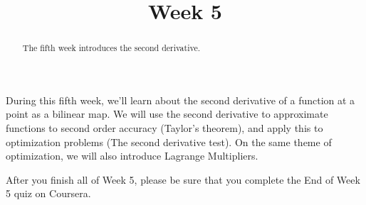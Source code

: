 \documentclass{ximera}
\title{Week 5}
\begin{document}
\begin{abstract}
  The fifth week introduces the second derivative.
\end{abstract}

During this fifth week, we'll learn about the second derivative of a
function at a point as a bilinear map.  We will use the second
derivative to approximate functions to second order accuracy (Taylor's
theorem), and apply this to optimization problems (The second
derivative test).  On the same theme of optimization, we will also
introduce Lagrange Multipliers.

After you finish all of Week 5, please be sure that you complete the
End of Week 5 quiz on Coursera.
\end{document}
